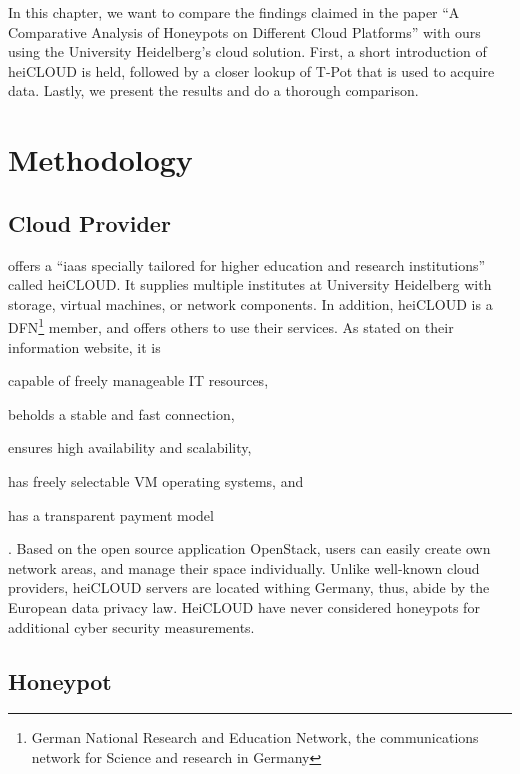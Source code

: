 In this chapter, we want to compare the findings \citet{Kelly2021} claimed in the paper \enquote{A Comparative Analysis of Honeypots on Different
    Cloud Platforms} with ours using the University Heidelberg's cloud solution.
First, a short introduction of heiCLOUD is held, followed by a closer lookup of T-Pot that is used to acquire data.
Lastly, we present the results and do a thorough comparison.

\section{Methodology}

\subsection{Cloud Provider}

\citet{urz2021} offers a \enquote{\ac{iaas} specially tailored for higher education and research institutions} called heiCLOUD.
It supplies multiple institutes at University Heidelberg with storage, virtual machines, or network components.
In addition, heiCLOUD is a DFN\footnote{German National Research and Education Network,  the communications network for Science and research in Germany} member, and offers others to use their services.
As stated on their information website\cite{heicloud2021}, it is
\begin{enumerate*}[label=(\roman*)]
    \item capable of freely manageable IT resources,
    \item beholds a stable and fast connection,
    \item ensures high availability and scalability,
    \item has freely selectable VM operating systems, and
    \item has a transparent payment model
\end{enumerate*} \cite{heicloud2021}.
Based on the open source application OpenStack, users can easily create own network areas, and manage their space individually.
Unlike well-known cloud providers, heiCLOUD servers are located withing Germany, thus, abide by the European data privacy law.
HeiCLOUD have never considered honeypots for additional cyber security measurements.

\subsection{Honeypot}
\label{sec:tpot}

